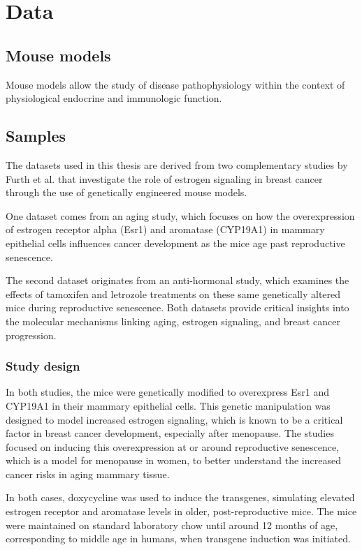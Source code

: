 \section{Data}
\label{sec:data}

\subsection{Mouse models}
Mouse models allow the study of disease pathophysiology within the context of
physiological endocrine and immunologic function.

\subsection{Samples}
The datasets used in this thesis are derived from two complementary studies by
Furth et al.
\supercite{furth_esr1_2023,furth_overexpression_2023}
that investigate the role of estrogen signaling in breast cancer through the
use of genetically engineered mouse models.

One dataset comes from an aging study, which focuses on how the overexpression
of estrogen receptor alpha (Esr1) and aromatase (CYP19A1) in mammary epithelial
cells influences cancer development as the mice age past reproductive
senescence.

The second dataset originates from an anti-hormonal study, which examines the
effects of tamoxifen and letrozole treatments on these same genetically altered
mice during reproductive senescence.
Both datasets provide critical insights into the molecular mechanisms linking
aging, estrogen signaling, and breast cancer progression.

\subsubsection{Study design}
In both studies, the mice were genetically modified to overexpress Esr1 and
CYP19A1 in their mammary epithelial cells.
This genetic manipulation was designed to model increased estrogen signaling,
which is known to be a critical factor in breast cancer development, especially
after menopause\supercite{furth_esr1_2023,furth_overexpression_2023}.
The studies focused on inducing this overexpression at or around reproductive
senescence, which is a model for menopause in women, to better understand the
increased cancer risks in aging mammary
tissue\supercite{furth_esr1_2023,furth_overexpression_2023}.

In both cases, doxycycline was used to induce the transgenes, simulating
elevated estrogen receptor and aromatase levels in older, post-reproductive
mice.
The mice were maintained on standard laboratory chow until around 12 months of
age, corresponding to middle age in humans, when transgene induction was
initiated\supercite{furth_esr1_2023,furth_overexpression_2023}.

